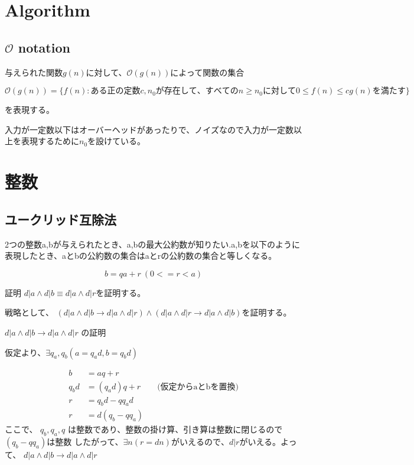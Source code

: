\documentclass[dvipdfmx]{jsarticle}
\begin{document}
\section{Algorithm}

\subsection{$\mathcal{O}$ notation}

与えられた関数$g(n)$に対して、$\mathcal{O}(g(n))$によって関数の集合


\[ \mathcal{O}(g(n)) = \{ f(n): ある正の定数c, n_0が存在して、すべてのn \ge n_0に対して0 \le f(n) \le cg(n)を満たす\} \]


を表現する。

入力が一定数以下はオーバーヘッドがあったりで、ノイズなので入力が一定数以上を表現するために$n_0$を設けている。

\section{整数}

\subsection{ユークリッド互除法}

2つの整数a,bが与えられたとき、a,bの最大公約数が知りたい.a,bを以下のように表現したとき、aとbの公約数の集合はaとrの公約数の集合と等しくなる。

\[ b = qa + r \ (0 <= r < a)\]

証明
$d | a \land d | b \equiv d | a \land d | r $を証明する。

戦略として、 $(d | a \land d | b \rightarrow d | a \land d | r) \land (d | a \land d | r \rightarrow  d | a \land d | b) $を証明する。

$d | a \land d | b \rightarrow d | a \land d | r$ の証明

仮定より、$\exists q_a, q_b ( a = q_ad, b = q_bd)$

\begin{align*}
  b &= aq + r \\
  q_bd &= (q_ad)q + r \qquad \text{(仮定からaとbを置換)} \\
  r &= q_bd - qq_ad \\
  r &= d(q_b - qq_a)
\end{align*}
ここで、 $q_b, q_a, q$ は整数であり、整数の掛け算、引き算は整数に閉じるので$(q_b - qq_a)$は整数
  したがって、$\exists n ( r = dn) がいえるので、 d | r$がいえる。よって、
  $d | a \land d | b \rightarrow d | a \land d | r$
\end{document}
